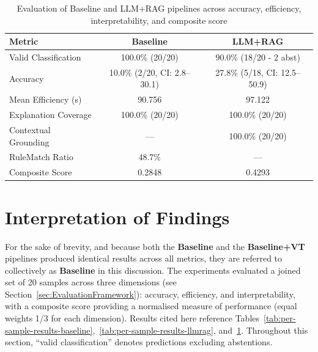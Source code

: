 \begin{table}[h!]
      \centering
      \caption{Evaluation of Baseline and LLM+RAG pipelines across accuracy, efficiency, interpretability, and composite score}
      \label{tab:results-summary}
      \begin{tabular}{lcc}
            \hline
            \textbf{Metric}      & \textbf{Baseline}           & \textbf{LLM+RAG}             \\
            \hline
            Valid Classification & 100.0\% (20/20)             & 90.0\% (18/20 - 2 abst)      \\
            Accuracy             & 10.0\% (2/20, CI: 2.8–30.1) & 27.8\% (5/18, CI: 12.5–50.9) \\
            Mean Efficiency (s)  & 90.756                      & 97.122                       \\
            Explanation Coverage & 100.0\% (20/20)             & 100.0\% (20/20)              \\
            Contextual Grounding & ---                         & 100.0\% (20/20)              \\
            RuleMatch Ratio      & 48.7\%                      & ---                          \\
            Composite Score      & 0.2848                      & 0.4293                       \\
            \hline
      \end{tabular}
\end{table}

\FloatBarrier

\section{Interpretation of Findings}\label{sec:InterpretationOfFindings}
For the sake of brevity, and because both the \textbf{Baseline} and the \textbf{Baseline+VT}
pipelines produced identical results across all metrics, they are referred to collectively as
\textbf{Baseline} in this discussion. The experiments evaluated a joined set of 20 samples across
three dimensions (see Section~\ref{sec:EvaluationFramework}): accuracy, efficiency, and
interpretability, with a composite score providing a normalised measure of performance (equal
weights 1/3 for each dimension). Results cited here reference
Tables~\ref{tab:per-sample-results-baseline},~\ref{tab:per-sample-results-llmrag},
and~\ref{tab:results-summary}. Throughout this section, “valid classification” denotes predictions
excluding abstentions.

